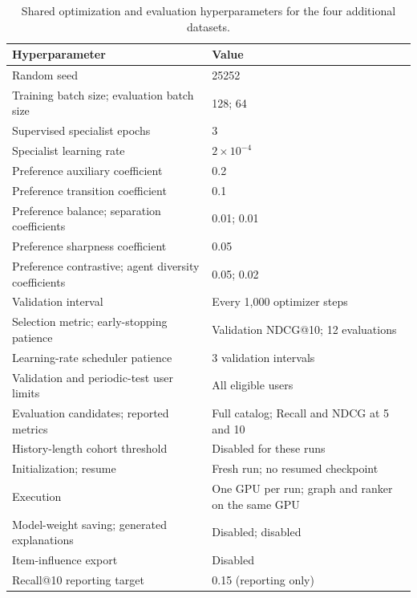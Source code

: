 ﻿\documentclass[sigconf,anonymous,review]{acmart}
\begin{document}
\begin{table}[!tbp]
    \centering
    \small
    \setlength{\tabcolsep}{5pt}
    \renewcommand{\arraystretch}{1.08}
    \begin{tabular}{p{}p{}}
        \toprule
        \textbf{Hyperparameter} & \textbf{Value} \\
        \midrule
        Random seed & 25252 \\
        Training batch size; evaluation batch size & 128; 64 \\
        Supervised specialist epochs & 3 \\
        Specialist learning rate & $2\times10^{-4}$ \\
        Preference auxiliary coefficient & 0.2 \\
        Preference transition coefficient & 0.1 \\
        Preference balance; separation coefficients & 0.01; 0.01 \\
        Preference sharpness coefficient & 0.05 \\
        Preference contrastive; agent diversity coefficients & 0.05; 0.02 \\
        Validation interval & Every 1,000 optimizer steps \\
        Selection metric; early-stopping patience & Validation NDCG@10; 12 evaluations \\
        Learning-rate scheduler patience & 3 validation intervals \\
        Validation and periodic-test user limits & All eligible users \\
        Evaluation candidates; reported metrics & Full catalog; Recall and NDCG at 5 and 10 \\
        History-length cohort threshold & Disabled for these runs \\
        Initialization; resume & Fresh run; no resumed checkpoint \\
        Execution & One GPU per run; graph and ranker on the same GPU \\
        Model-weight saving; generated explanations & Disabled; disabled \\
        Item-influence export & Disabled \\
        Recall@10 reporting target & 0.15 (reporting only) \\
        \bottomrule
    \end{tabular}
    \caption{Shared optimization and evaluation hyperparameters for the four additional datasets.}
    \label{tab:additional_hyperparameters_training}
\end{table}
\end{document}

